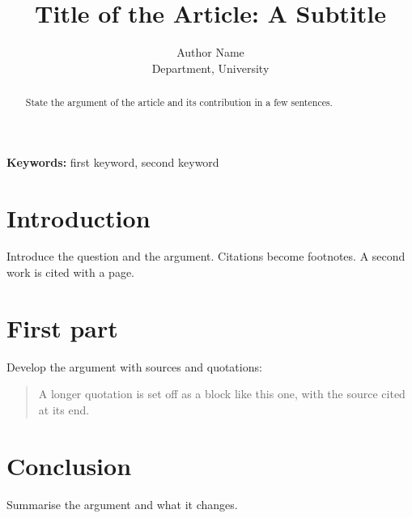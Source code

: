 \documentclass[12pt,a4paper]{article}
\title{Title of the Article: A Subtitle}
\author{Author Name\\ \small Department, University}
\date{}
\begin{document}
\maketitle

\begin{abstract}
State the argument of the article and its contribution in a few sentences.
\end{abstract}

\noindent\textbf{Keywords:} first keyword, second keyword

\section{Introduction}
Introduce the question and the argument. Citations become footnotes.\autocite{anderson1983}
A second work is cited with a page.\autocite[3]{said1978}

\section{First part}
Develop the argument with sources and quotations:
\blockquote{A longer quotation is set off as a block like this one, with the
source cited at its end.}

\section{Conclusion}
Summarise the argument and what it changes.

\printbibliography
\end{document}
